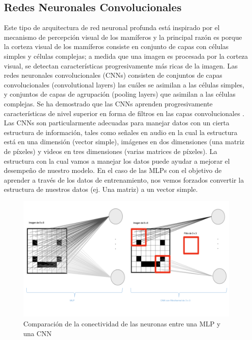\begin{onehalfspacing}
\subsection{Redes Neuronales Convolucionales}
\label{CNN}
Este tipo de arquitectura de red neuronal profunda está inspirado por el mecanismo de percepción visual de los mamíferos y la principal razón es porque la corteza visual de los mamíferos consiste en conjunto de capas con células simples y células complejas; a medida que una imagen es procesada por la corteza visual, se detectan características progresivamente más ricas de la imagen. Las redes neuronales convolucionales (CNNs) consisten de conjuntos de capas convolucionales (convolutional layers) las cuáles se asimilan a las células simples, y conjuntos de capas de agrupación (pooling layers) que asimilan a las células complejas. Se ha demostrado que las CNNs aprenden progresivamente características de nivel superior en forma de filtros en las capas convolucionales \cite{Lecun2015DeepLearning}.\\

Las CNNs son particularmente adecuadas para manejar datos con un cierta estructura de información, tales como señales en audio en la cual la estructura está en una dimensión (vector simple), imágenes en dos dimensiones (una matriz de píxeles) y videos en tres dimensiones (varias matrices de píxeles). La estructura con la cual vamos a manejar los datos puede ayudar a mejorar el desempeño de nuestro modelo. En el caso de las MLPs con el objetivo de aprender a través de los datos de entrenamiento, nos vemos forzados convertir la estructura de nuestros datos (ej. Una matriz) a un vector simple.\\

\begin{figure}[th]
	\centering
	\includegraphics[width=13cm,keepaspectratio]{XX_Figures/Fig_Comparacion_MLP_CNN.png}
	\caption{\footnotesize Comparación de la conectividad de las neuronas entre una MLP y una CNN}
	\label{fig:Fig_Comparacion_MLP_CNN}
\end{figure}


\end{onehalfspacing}
